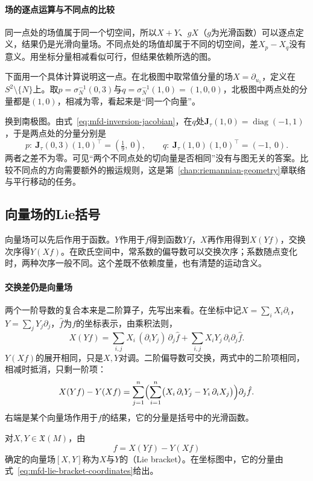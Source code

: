 \paragraph{场的逐点运算与不同点的比较}
同一点处的场值属于同一个切空间，所以$X+Y$、$gX$（$g$为光滑函数）可以逐点定义，结果仍是光滑向量场。不同点处的场值却属于不同的切空间，差$X_p-X_q$没有意义。用坐标分量相减看似可行，但结果依赖所选的图。

下面用一个具体计算说明这一点。在北极图中取常值分量的场$X=\partial_{u_1}$，定义在$S^2\setminus\{N\}$上。取$p=\sigma_N^{-1}(0,3)$与$q=\sigma_N^{-1}(1,0)=(1,0,0)$，北极图中两点处的分量都是$(1,0)$，相减为零，看起来是“同一个向量”。

换到南极图。由式~\eqref{eq:mfd-inversion-jacobian}，在$q$处$\bm J_\tau(1,0)=\operatorname{diag}(-1,1)$，于是两点处的分量分别是
\[
p:\ \bm J_\tau(0,3)(1,0)^\top=(\tfrac19,\ 0),\qquad
q:\ \bm J_\tau(1,0)(1,0)^\top=(-1,\ 0).
\]
两者之差不为零。可见“两个不同点处的切向量是否相同”没有与图无关的答案。比较不同点的方向需要额外的搬运规则，这是第~\ref{chap:riemannian-geometry}章联络与平行移动的任务。

\subsection{向量场的Lie括号}
\label{sec:mfd-lie-bracket}

向量场可以先后作用于函数。$Y$作用于$f$得到函数$Yf$，$X$再作用得到$X(Yf)$，交换次序得$Y(Xf)$。在欧氏空间中，常系数的偏导数可以交换次序；系数随点变化时，两种次序一般不同。这个差既不依赖度量，也有清楚的运动含义。

\paragraph{交换差仍是向量场}
两个一阶导数的复合本来是二阶算子，先写出来看。在坐标中记$X=\sum_iX_i\partial_i$，$Y=\sum_jY_j\partial_j$，$\hat f$为$f$的坐标表示，由乘积法则，
\[
X(Yf)=\sum_{i,j}X_i\,(\partial_iY_j)\,\partial_j\hat f+\sum_{i,j}X_iY_j\,\partial_i\partial_j\hat f .
\]
$Y(Xf)$的展开相同，只是$X,Y$对调。二阶偏导数可交换，两式中的二阶项相同，相减时抵消，只剩一阶项：
\begin{equation}
X(Yf)-Y(Xf)=\sum_{j=1}^n\Bigl(\sum_{i=1}^n\bigl(X_i\,\partial_iY_j-Y_i\,\partial_iX_j\bigr)\Bigr)\partial_j\hat f .
\label{eq:mfd-lie-bracket-coordinates}
\end{equation}
右端是某个向量场作用于$f$的结果，它的分量是括号中的光滑函数。

\begin{definition}[Lie括号]
\label{def:mfd-lie-bracket}
对$X,Y\in\mathfrak X(M)$，由
\begin{equation}
[X,Y]f=X(Yf)-Y(Xf)
\label{eq:mfd-lie-bracket-def}
\end{equation}
确定的向量场$[X,Y]$称为$X$与$Y$的（Lie bracket）。在坐标图中，它的分量由式~\eqref{eq:mfd-lie-bracket-coordinates}给出。
\end{definition}

